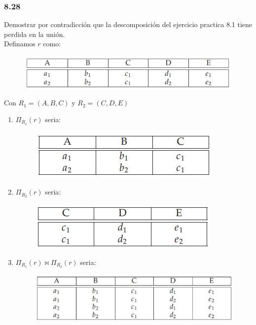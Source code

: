 \documentclass[twoside]{article}
\begin{document}
\subsubsection*{8.28}
Demostrar por contradicci\'on que la descomposici\'on del ejercicio practica 8.1 tiene perdida en la uni\'on.\\
\newline
Definamos $r$ como:
\begin{figure}[H]
      \begin{center}
            \includegraphics[scale=0.6]{tabla1.png}
      \end{center}
\end{figure}
Con $R_1 = (A, B, C)$ y $R_2 = (C, D, E)$\\
\begin{enumerate}
      \item $\Pi_{R_1}(r)$ seria:
            \begin{figure}[H]
                  \begin{center}
                        \includegraphics[scale=0.6]{tabla2.png}
                  \end{center}
            \end{figure}
      \item $\Pi_{R_2}(r)$ seria:
            \begin{figure}[H]
                  \begin{center}
                        \includegraphics[scale=0.6]{tabla3.png}
                  \end{center}
            \end{figure}
      \item $\Pi_{R_1}(r) \bowtie \Pi_{R_2}(r)$ seria:

            \begin{figure}[H]
                  \begin{center}
                        \includegraphics[scale=0.6]{tabla4.png}
                  \end{center}
            \end{figure}
\end{enumerate}
\end{document}
